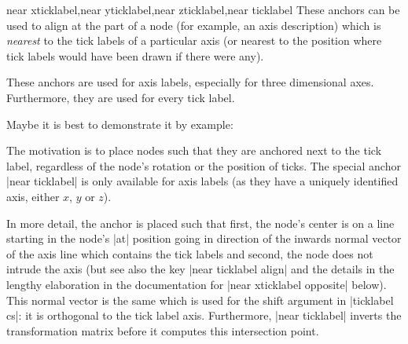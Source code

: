 \begin{anchorlist}{near xticklabel,near yticklabel,near zticklabel,near ticklabel}
\label{key:near:ticklabel}
    These anchors can be used to align at the part of a node (for example, an
    axis description) which is \emph{nearest} to the tick labels of a
    particular axis (or nearest to the position where tick labels would have
    been drawn if there were any).

    These anchors are used for axis labels, especially for three dimensional
    axes. Furthermore, they are used for every tick label.

    Maybe it is best to demonstrate it by example:
\begin{codeexample}[]
\end{codeexample}

    The motivation is to place nodes such that they are anchored next to the
    tick label, regardless of the node's rotation or the position of ticks. The
    special anchor |near ticklabel| is only available for axis labels (as they
    have a uniquely identified axis, either $x$, $y$ or $z$).

    In more detail, the anchor is placed such that first, the node's center is
    on a line starting in the node's |at| position going in direction of the
    inwards normal vector of the axis line which contains the tick labels and
    second, the node does not intrude the axis (but see also the key
    |near ticklabel align| and the details in the lengthy elaboration in the
    documentation for |near xticklabel opposite| below). This normal vector is
    the same which is used for the shift argument in |ticklabel cs|: it is
    orthogonal to the tick label axis. Furthermore, |near ticklabel| inverts
    the transformation matrix before it computes this intersection point.


\end{anchorlist}
